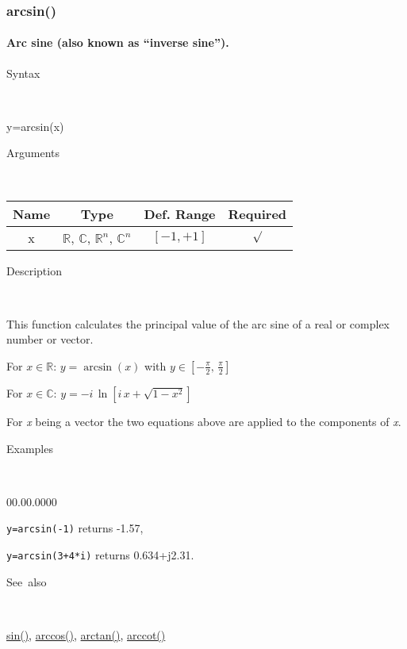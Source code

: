 \newpage
\subsubsection*{\hypertarget{arcsin}{}{\Large arcsin()}}


\paragraph{\label{par:Arc-sine}Arc sine (also known as {}``inverse sine'').}

\begin{description}
\item [Syntax]~
\end{description}
y=arcsin(x)

\begin{description}
\item [Arguments]~
\end{description}
\begin{tabular}{|c|c|c|c|}
\hline 
Name&
Type&
Def. Range&
Required\tabularnewline
\hline
\hline 
x&
$\mathbb{R}$, $\mathbb{C}$, $\mathbb{R}^{n}$, $\mathbb{C}^{n}$&
$\left[-1,+1\right]$&
$\surd$\tabularnewline
\hline
\end{tabular}

\begin{description}
\item [Description]~
\end{description}
This function calculates the principal value of the arc sine of a
real or complex number or vector.

\medskip{}
For $x\in\mathbb{R}$: $y=\arcsin\left(x\right)$ with $y\in\left[-\frac{\pi}{2},\,\frac{\pi}{2}\right]$

\medskip{}
For $x\in\mathbb{C}$: $y=-i\,\ln\left[i\, x+\sqrt{1-x^{2}}\right]$
\medskip{}

For \textit{x} being a vector the two equations above are
applied to the components of \textit{x}.

\begin{description}
\item [Examples]~
\end{description}
\begin{lyxlist}{00.00.0000}
\item [\texttt{y=arcsin(-1)}]returns -1.57,
\item [\texttt{y=arcsin(3+4{*}i)}]returns 0.634+j2.31.
\end{lyxlist}
\begin{description}
\item [See~also]~
\end{description}
\textcolor{blue}{\hyperlink{sin}{sin()}}\textcolor{black}{,} \textcolor{blue}{\hyperlink{arccos}{arccos()}}\textcolor{black}{,}
\textcolor{blue}{\hyperlink{arctan}{arctan()}}\textcolor{black}{,}
\textcolor{blue}{\hyperlink{arccot}{arccot()}}


